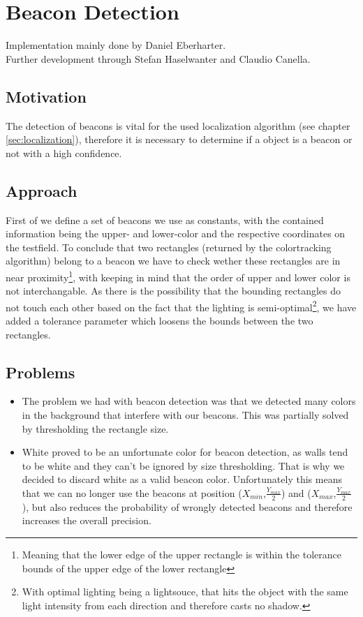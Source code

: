 \documentclass[703031]{iisreport}
\begin{document}
\section{Beacon Detection}
Implementation mainly done by Daniel Eberharter. \\
Further development through Stefan Haselwanter and Claudio Canella.

\subsection{Motivation}
The detection of beacons is vital for the used localization algorithm (see chapter \ref{sec:localization}), therefore it is necessary to determine if a object is a beacon or not with a high confidence.

\subsection{Approach}
First of we define a set of beacons we use as constants, with the contained information being the upper- and lower-color and the respective coordinates on the testfield. To conclude that two rectangles (returned by the colortracking algorithm) belong to a beacon we have to check wether these rectangles are in near proximity\footnote{Meaning that the lower edge of the upper rectangle is within the tolerance bounds of the upper edge of the lower rectangle}, with keeping in mind that the order of upper and lower color is not interchangable. 
As there is the possibility that the bounding rectangles do not touch each other based on the fact that the lighting is semi-optimal\footnote{With optimal lighting being a lightsouce, that hits the object with the same light intensity from each direction and therefore casts no shadow.}, we have added a tolerance parameter which loosens the bounds between the two rectangles.

\subsection{Problems}
	\begin{itemize}
		\item The problem we had with beacon detection was that we detected many colors in the background that interfere with our beacons. This was partially solved by thresholding the rectangle size.
		\item White proved to be an unfortunate color for beacon detection, as walls tend to be white and they can't be ignored by size thresholding. That is why we decided to discard white as a valid beacon color. Unfortunately this means that we can no longer use the beacons at position ($X_{min}$,$\frac{Y_{max}}{2}$) and ($X_{max}$,$\frac{Y_{max}}{2}$), but also reduces the probability of wrongly detected beacons and therefore increases the overall precision.
	\end{itemize}
\end{document}
